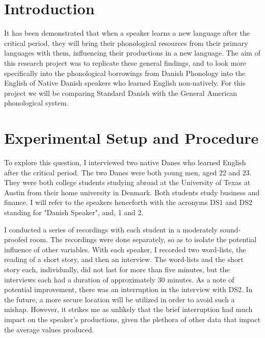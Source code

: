 \bigskip

\section{Introduction}

\bigskip
    
  \quad It has been demonstrated that when a speaker learns a new language after the critical period, they will bring their phonological resources from their primary languages with them, influencing their productions in a new language. The aim of this research project was to replicate these general findings, and to look more specifically into the phonological borrowings from Danish Phonology into the English of Native Danish speakers who learned English non-natively. For this project we will be comparing Standard Danish with the General American phonological system.


    
    
    
   
    
    \bigskip
    

   
\section{Experimental Setup and Procedure}
    
    \bigskip
    
   \quad To explore this question, I interviewed two native Danes who learned English after the critical period. The two Danes were both young men, aged 22 and 23. They were both college students studying abroad at the University of Texas at Austin from their home university in Denmark. Both students study business and finance. I will refer to the speakers henceforth with the acronyms DS1 and DS2 standing for "Danish Speaker", and, 1 and 2.
   
    \bigksip   
    \bigskip
    
  I conducted a series of recordings with each student in a moderately sound-proofed room. The recordings were done separately, so as to isolate the potential influence of other variables. With each speaker, I recorded two word-lists, the reading of a short story, and then an interview. The word-lists and the short story each, individually, did not last for more than five minutes, but the interviews each had a duration of approximately 30 minutes. As a note of potential improvement, there was an interruption in the interview with DS2. In the future, a more secure location will be utilized in order to avoid such a mishap. However, it strikes me as unlikely that the brief interruption had much impact on the speaker's productions, given the plethora of other data that impact the average values produced.
    
